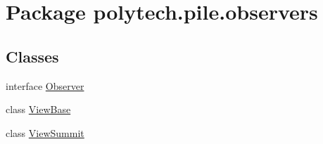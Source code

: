 \hypertarget{namespacepolytech_1_1pile_1_1observers}{}\section{Package polytech.\+pile.\+observers}
\label{namespacepolytech_1_1pile_1_1observers}
\subsection*{Classes}
\begin{DoxyCompactItemize}
\item 
interface \hyperlink{interfacepolytech_1_1pile_1_1observers_1_1_observer}{Observer}
\item 
class \hyperlink{classpolytech_1_1pile_1_1observers_1_1_view_base}{View\+Base}
\item 
class \hyperlink{classpolytech_1_1pile_1_1observers_1_1_view_summit}{View\+Summit}
\end{DoxyCompactItemize}
